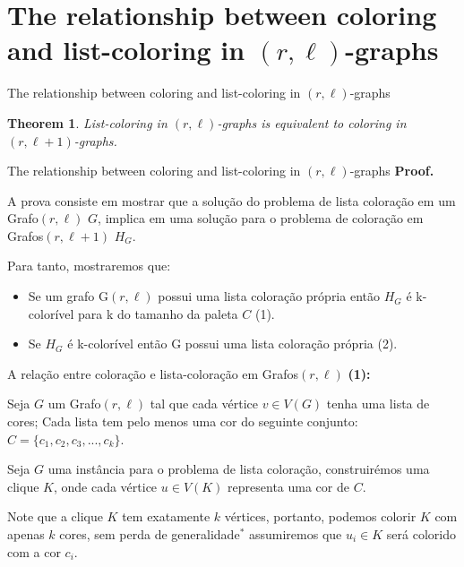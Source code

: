 \documentclass[9pt, compress]{beamer}
\newtheorem{teorema}{Theorem}
\newcommand{\?}{\textcolor{warn}{\textit{?}}}
\begin{document}
    \section{The relationship between coloring and list-coloring in $(r,\ell)$-graphs}
    \begin{frame}{The relationship between coloring and list-coloring in $(r,\ell)$-graphs}
        \begin{teorema}
          List-coloring in $(r,\ell)$-graphs is equivalent to coloring in $(r,\ell+1)$-graphs. 
        \end{teorema}
    \end{frame}
    \begin{frame}{The relationship between coloring and list-coloring in $(r,\ell)$-graphs}
        \textbf{Proof.}
        
        A prova consiste em mostrar que a solução do problema de lista coloração em um Grafo$(r,\ell)$ $G$, implica em uma solução para o problema de coloração em Grafos$(r,\ell+1)$ $H_G$.
        
        Para tanto, mostraremos que:
          \begin{itemize}
        \item Se um grafo G$(r,\ell)$ possui uma lista coloração própria então $H_G$ é k-colorível para k do tamanho da paleta $C$ (1).
		\item Se $H_G$ é k-colorível então G possui uma lista coloração própria (2).
      \end{itemize}
    \end{frame}
    \begin{frame}{A relação entre coloração e lista-coloração em Grafos$(r,\ell)$}
      \textbf{(1):}
      
      Seja $G$ um Grafo$(r,\ell)$ tal que cada vértice $v \in V(G)$ tenha uma lista de cores; 
      Cada lista tem pelo menos uma cor do seguinte conjunto: $C = \{c_1,c_2,c_3,...,c_k \}$. 
      \begin{center}
        \begin{figure}
        
      \end{figure}
      \end{center}
    \end{frame}
    \begin{frame}
      Seja $G$ uma instância para o problema de lista coloração, construirémos uma clique $K$, onde cada vértice $u \in V(K)$ representa uma cor de $C$.
      \begin{center}
      \begin{figure}
        
      \end{figure}  
      \end{center}
      Note que a clique $K$ tem exatamente $k$ vértices, portanto, podemos colorir $K$ com apenas $k$ cores, sem perda de generalidade$^*$ assumiremos que $u_i \in K$ será colorido com a cor $c_i$.
    \end{frame}
\end{document}
